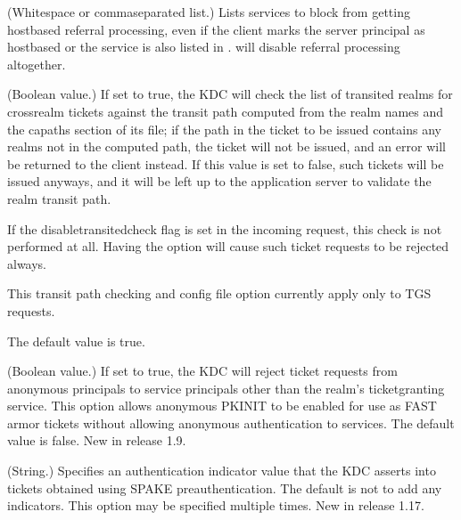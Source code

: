 \documentclass[letterpaper,10pt,english]{sphinxmanual}
\begin{document}
\begin{description}
\sphinxAtStartPar
(Whitespace\sphinxhyphen{} or comma\sphinxhyphen{}separated list.)  Lists services to block
from getting host\sphinxhyphen{}based referral processing, even if the client
marks the server principal as host\sphinxhyphen{}based or the service is also
listed in .   will
disable referral processing altogether.

\sphinxAtStartPar
(Boolean value.)  If set to true, the KDC will check the list of
transited realms for cross\sphinxhyphen{}realm tickets against the transit path
computed from the realm names and the capaths section of its
{\hyperref[\detokenize{admin/conf_files/krb5_conf:krb5-conf-5}]{}} file; if the path in the ticket to be issued
contains any realms not in the computed path, the ticket will not
be issued, and an error will be returned to the client instead.
If this value is set to false, such tickets will be issued
anyways, and it will be left up to the application server to
validate the realm transit path.

\sphinxAtStartPar
If the disable\sphinxhyphen{}transited\sphinxhyphen{}check flag is set in the incoming
request, this check is not performed at all.  Having the
 option will cause such ticket requests to
be rejected always.

\sphinxAtStartPar
This transit path checking and config file option currently apply
only to TGS requests.

\sphinxAtStartPar
The default value is true.

\sphinxAtStartPar
(Boolean value.)  If set to true, the KDC will reject ticket
requests from anonymous principals to service principals other
than the realm’s ticket\sphinxhyphen{}granting service.  This option allows
anonymous PKINIT to be enabled for use as FAST armor tickets
without allowing anonymous authentication to services.  The
default value is false.  New in release 1.9.

\sphinxAtStartPar
(String.)  Specifies an authentication indicator value that the
KDC asserts into tickets obtained using SPAKE pre\sphinxhyphen{}authentication.
The default is not to add any indicators.  This option may be
specified multiple times.  New in release 1.17.


\end{description}
\end{document}
